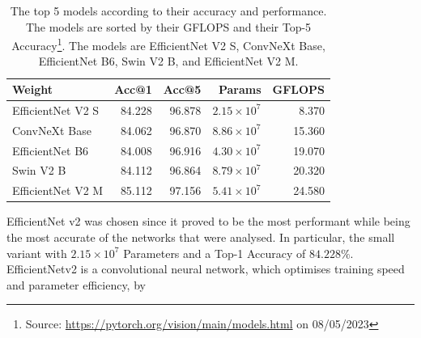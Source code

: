 \begin{table}[ht]
  \caption[Top 5 models for Accuracy and Performance]{The top 5 models according to their accuracy and performance. The models are sorted by their GFLOPS and their Top-5 Accuracy\footnote{Source: \url{https://pytorch.org/vision/main/models.html} on 08/05/2023}. The models are EfficientNet V2 S, ConvNeXt Base, EfficientNet B6, Swin V2 B, and EfficientNet V2 M.}
  \label{tab:network_comparison}
  \centering
  \begin{tabular}{lrrrr}
    \hline
            Weight &  Acc@1 &  Acc@5 &   Params &  GFLOPS \\
    \hline
  EfficientNet V2 S & 84.228 & 96.878 & $2.15 \times 10^7$ &   8.370 \\
      ConvNeXt Base & 84.062 & 96.870 & $8.86 \times 10^7$ &  15.360 \\
    EfficientNet B6 & 84.008 & 96.916 & $4.30 \times 10^7$ &  19.070 \\
          Swin V2 B & 84.112 & 96.864 & $8.79 \times 10^7$ &  20.320 \\
  EfficientNet V2 M & 85.112 & 97.156 & $5.41 \times 10^7$ &  24.580 \\
  \hline
  \end{tabular}
\end{table}

EfficientNet v2 was chosen since it proved to be the most performant while being the most accurate of the networks that were analysed. In particular, the small variant with $2.15 \times 10^7$ Parameters and a Top-1 Accuracy of $84.228\%$. EfficientNetv2 is a convolutional neural network, which optimises training speed and parameter efficiency, by 